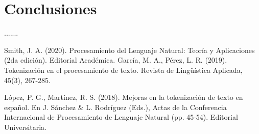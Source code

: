 \documentclass[conference]{IEEEtran}
\begin{document}
\section{Conclusiones}
.......

\begin{thebibliography}{00}
 Smith, J. A. (2020). Procesamiento del Lenguaje Natural: Teoría y Aplicaciones (2da edición). Editorial Académica.
 García, M. A., Pérez, L. R. (2019). Tokenización en el procesamiento de texto. Revista de Lingüística Aplicada, 45(3), 267-285.

 López, P. G., Martínez, R. S. (2018). Mejoras en la tokenización de texto en español. En J. Sánchez \& L. Rodríguez (Eds.), Actas de la Conferencia Internacional de Procesamiento de Lenguaje Natural (pp. 45-54). Editorial Universitaria.
\end{thebibliography}
\end{document}
